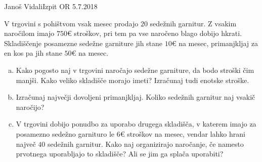 \begin{naloga}{Janoš Vidali}{Izpit OR 5.7.2018}
\begin{vprasanje}
V trgovini s pohištvom vsak mesec prodajo $20$ sedežnih garnitur.
Z vsakim naročilom imajo $750 €$ stroškov,
pri tem pa vse naročeno blago dobijo hkrati.
Skladiščenje posamezne sedežne garniture jih stane $10 €$ na mesec,
primanjkljaj za en kos pa jih stane $50 €$ na mesec.

\begin{enumerate}[(a)]
\item Kako pogosto naj v trgovini naročajo sedežne garniture,
da bodo stroški čim manjši.
Kako veliko skladišče morajo imeti?
Izračunaj tudi enotske stroške.

\item Izračunaj največji dovoljeni primanjkljaj.
Koliko sedežnih garnitur naj vsakič naročijo?

\item V trgovini dobijo ponudbo za uporabo drugega skladišča,
v katerem imajo za po\-sa\-mez\-no se\-dež\-no garnituro
le $6 €$ stroškov na mesec,
vendar lahko hrani največ $40$ sedežnih garnitur.
Kako naj organizirajo naročanje,
če namesto prvotnega uporabljajo to skladišče?
Ali se jim ga splača uporabiti?
\end{enumerate}
\end{vprasanje}
\begin{odgovor}
\end{odgovor}
\end{naloga}
